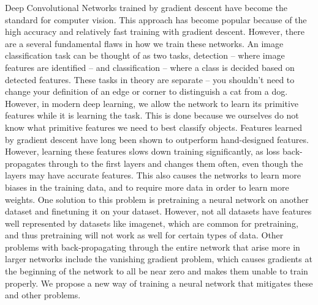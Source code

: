 \documentclass[twocolumn]{article}
\begin{document}
Deep Convolutional Networks trained by gradient descent have become the standard for computer vision. This approach has become popular because of the high accuracy and relatively fast training with gradient descent.\cite{alexnet}\cite{Lecun98gradient} However, there are a several fundamental flaws in how we train these networks. An image classification task can be thought of as two tasks, detection -- where image features are identified -- and classification -- where a class is decided based on detected features. These tasks in theory are separate -- you shouldn't need to change your definition of an edge or corner to distinguish a cat from a dog.\cite{cowardtowards} However, in modern deep learning, we allow the network to learn its primitive features while it is learning the task. This is done because we ourselves do not know what primitive features we need to best classify objects. Features learned by gradient descent have long been shown to outperform hand-designed features.\cite{learnvcraft} However, learning these features slows down training significantly, as loss back-propagates through to the first layers and changes them often, even though the layers may have accurate features. This also causes the networks to learn more biases in the training data, and to require more data in order to learn more weights. One solution to this problem is pretraining a neural network on another dataset and finetuning it on your dataset. However, not all datasets have features well represented by datasets like imagenet, which are common for pretraining, and thus pretraining will not work as well for certain types of data. Other problems with back-propagating through the entire network that arise more in larger networks include the vanishing gradient problem, which causes gradients at the beginning of the network to all be near zero and makes them unable to train properly.\cite{vanishinggradients}\cite{learningproblems} We propose a new way of training a neural network that mitigates these and other problems.
\end{document}
